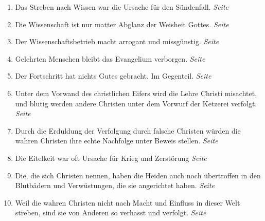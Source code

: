 \begin{enumerate}
 \item Das Streben nach Wissen war die Ursache für den Sündenfall.
 \dotfill \textit{Seite~\pageref{ref:07_03_wissen_erbsuende}}\\

 \item Die Wissenschaft ist nur matter Abglanz der Weisheit Gottes.
 \dotfill \textit{Seite~\pageref{ref:07_03_wissen_erbsuende}}\\

 \item Der Wissenschaftsbetrieb macht arrogant und missgünstig.
 \dotfill \textit{Seite~\pageref{ref:07_06_wissenschaft}}\\

 \item Gelehrten Menschen bleibt das Evangelium verborgen.
 \dotfill \textit{Seite~\pageref{ref:07_13_gelehrte}}\\

 \item Der Fortschritt hat nichts Gutes gebracht. Im Gegenteil.
 \dotfill \textit{Seite~\pageref{ref:07_14_vortschritt}}\\

 \item Unter dem Vorwand des christlichen Eifers wird die Lehre Christi
misachtet, und blutig werden andere Christen unter dem Vorwurf der Ketzerei verfolgt.
 \dotfill \textit{Seite~\pageref{ref:07_14_ketzer}}\\

 \item Durch die Erduldung der Verfolgung durch falsche Christen würden die
wahren Christen ihre echte Nachfolge unter Beweis stellen.
 \dotfill \textit{Seite~\pageref{ref:07_16_vervolgung}}\\

 \item Die Eitelkeit war oft Ursache für Krieg und Zerstörung
 \dotfill \textit{Seite~\pageref{ref:08_01_stolz}}\\

 \item Die, die sich Christen nennen, haben die Heiden auch noch übertroffen in
den Blutbädern und Verwüstungen, die sie angerichtet haben.
 \dotfill \textit{Seite~\pageref{ref:08_06_heiden}}\\

 \item Weil die wahren Christen nicht nach Macht und Einfluss in dieser Welt
streben, sind sie von Anderen so verhasst und verfolgt.
 \dotfill \textit{Seite~\pageref{ref:08_08_reich_gottes}}\\


\end{enumerate}
